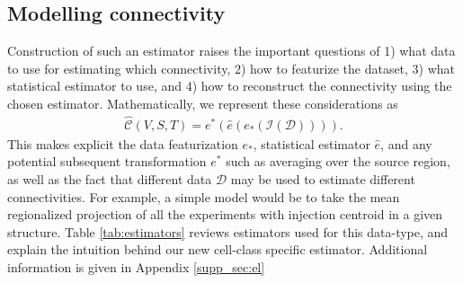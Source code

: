 \documentclass[NETN,manuscript]{stjour-new}
\begin{document}
\subsection{Modelling connectivity}

Construction of such an estimator raises the important questions of 1) what data to use for estimating which connectivity, 2) how to featurize the dataset, 3) what statistical estimator to use, and 4) how to reconstruct the connectivity using the chosen estimator.
Mathematically, we represent these considerations as 
\begin{align}
\label{eq:estimator}
\widehat { \mathcal C }(V,S,T) = e^* (\widehat e (e_*(\mathcal{I} (\mathcal D)))).
\end{align}
This makes explicit the data featurization $e_{*}$, statistical estimator $\widehat e$, and any potential subsequent transformation $e^*$ such as averaging over the source region, as well as the fact that different data $\mathcal D$ may be used to estimate different connectivities.
For example, a simple model would be to take the mean regionalized projection of all the experiments with injection centroid in a given structure.
Table \ref{tab:estimators} reviews estimators used for this data-type, and explain the intuition behind our new cell-class specific estimator.
Additional information is given in Appendix \ref{supp_sec:el} 
\end{document}
